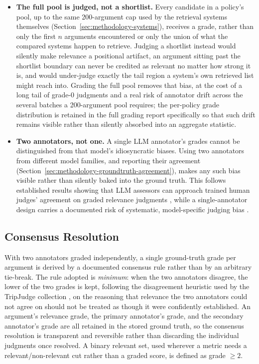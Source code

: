 \begin{itemize}
\item \textbf{The full pool is judged, not a shortlist.} Every candidate in a policy's pool, up to
the same 200-argument cap used by the retrieval systems themselves
(Section~\ref{sec:methodology-systems}), receives a grade, rather than only the first $n$
arguments encountered or only the union of what the compared systems happen to retrieve. Judging
a shortlist instead would silently make relevance a positional artifact, an argument sitting past
the shortlist boundary can never be credited as relevant no matter how strong it is, and would
under-judge exactly the tail region a system's own retrieved list might reach into. Grading the
full pool removes that bias, at the cost of a long tail of grade-0 judgments and a real risk of
annotator drift across the several batches a 200-argument pool requires; the per-policy grade
distribution is retained in the full grading report specifically so that such drift remains
visible rather than silently absorbed into an aggregate statistic.

\item \textbf{Two annotators, not one.} A single LLM annotator's grades cannot be distinguished
from that model's idiosyncratic biases. Using two annotators from different model families, and
reporting their agreement (Section~\ref{sec:methodology-groundtruth-agreement}), makes any such
bias visible rather than silently baked into the ground truth. This follows established results
showing that LLM assessors can approach trained human judges' agreement on graded relevance
judgments \cite{thomas2024llmjudge,upadhyay2024umbrela,upadhyay2025largescale}, while a
single-annotator design carries a documented risk of systematic, model-specific judging bias
\cite{panickssery2024selfpref}.
\end{itemize}

\subsection{Consensus Resolution}
\label{sec:methodology-groundtruth-consensus}

With two annotators graded independently, a single ground-truth grade per argument is derived by a
documented consensus rule rather than by an arbitrary tie-break. The rule adopted is
\emph{minimum}: when the two annotators disagree, the lower of the two grades is kept, following
the disagreement heuristic used by the TripJudge collection \cite{althammer2022tripjudge}, on the
reasoning that relevance the two annotators could not agree on should not be treated as though it
were confidently established. An argument's relevance grade, the primary annotator's grade, and
the secondary annotator's grade are all retained in the stored ground truth, so the consensus
resolution is transparent and reversible rather than discarding the individual judgments once
resolved. A binary relevant set, used wherever a metric needs a relevant/non-relevant cut rather
than a graded score, is defined as grade $\geq 2$.

